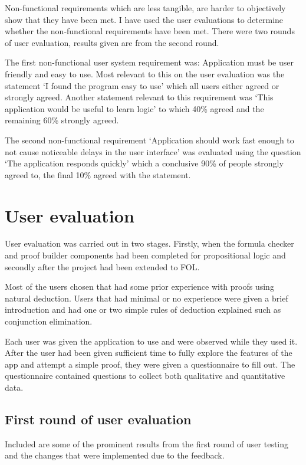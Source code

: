 Non-functional requirements which are less tangible, are harder to objectively show that they have been met. I have used the user evaluations to determine whether the non-functional requirements have been met. There were two rounds of user evaluation, results given are from the second round.

The first non-functional user system requirement was:  Application must be user friendly and easy to use. Most relevant to this on the user evaluation was the statement `I found the program easy to use' which all users either agreed or strongly agreed. Another statement relevant to this requirement was `This application would be useful to learn logic' to which 40\% agreed and the remaining 60\% strongly agreed.

The second non-functional requirement `Application should work fast enough to not cause noticeable delays in the user interface' was evaluated using the question `The application responds quickly' which a conclusive 90\% of people strongly agreed to, the final 10\% agreed with the statement.

\section{User evaluation}

User evaluation was carried out in two stages. Firstly, when the formula checker and proof builder components had been completed for propositional logic and secondly after the project had been extended to FOL.

Most of the users chosen that had some prior experience with proofs using natural deduction. Users that had minimal or no experience were given a brief introduction and had one or two simple rules of deduction explained such as conjunction elimination.

Each user was given the application to use and were observed while they used it. After the user had been given sufficient time to fully explore the features of the app and attempt a simple proof, they were given a questionnaire to fill out. The questionnaire contained questions to collect both qualitative and quantitative data. 

\subsection{First round of user evaluation}

Included are some of the prominent results from the first round of user testing and the changes that were implemented due to the feedback.

